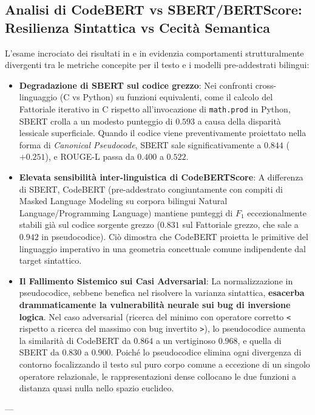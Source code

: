 \subsection{Analisi di CodeBERT vs SBERT/BERTScore: Resilienza Sintattica vs Cecità Semantica}
L'esame incrociato dei risultati in  e in  evidenzia comportamenti strutturalmente divergenti tra le metriche concepite per il testo e i modelli pre-addestrati bilingui:
\begin{itemize}
    \item \textbf{Degradazione di SBERT sul codice grezzo}: Nei confronti cross-linguaggio (C vs Python) su funzioni equivalenti, come il calcolo del Fattoriale iterativo in C rispetto all'invocazione di \texttt{math.prod} in Python, SBERT crolla a un modesto punteggio di $0.593$ a causa della disparità lessicale superficiale. Quando il codice viene preventivamente proiettato nella forma di \emph{Canonical Pseudocode}, SBERT sale significativamente a $0.844$ ($+0.251$), e ROUGE-L passa da $0.400$ a $0.522$.
    \item \textbf{Elevata sensibilità inter-linguistica di CodeBERTScore}: A differenza di SBERT, CodeBERT (pre-addestrato congiuntamente con compiti di Masked Language Modeling su corpora bilingui Natural Language/Programming Language) mantiene punteggi di $F_1$ eccezionalmente stabili già sul codice sorgente grezzo ($0.831$ sul Fattoriale grezzo, che sale a $0.942$ in pseudocodice). Ciò dimostra che CodeBERT proietta le primitive del linguaggio imperativo in una geometria concettuale comune indipendente dal target sintattico.
    \item \textbf{Il Fallimento Sistemico sui Casi Adversarial}: La normalizzazione in pseudocodice, sebbene benefica nel risolvere la varianza sintattica, \textbf{esacerba drammaticamente la vulnerabilità neurale sui bug di inversione logica}. Nel caso adversarial (ricerca del minimo con operatore corretto \texttt{<} rispetto a ricerca del massimo con bug invertito \texttt{>}), lo pseudocodice aumenta la similarità di CodeBERT da $0.864$ a un vertiginoso $0.968$, e quella di SBERT da $0.830$ a $0.900$. Poiché lo pseudocodice elimina ogni divergenza di contorno focalizzando il testo sul puro corpo comune a eccezione di un singolo operatore relazionale, le rappresentazioni dense collocano le due funzioni a distanza quasi nulla nello spazio euclideo.
\end{itemize}

---

